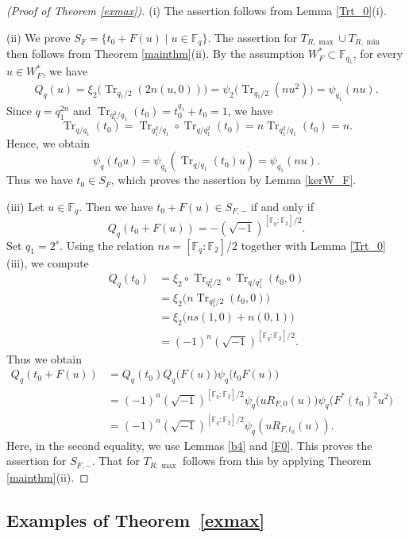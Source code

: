 \documentclass[12pt,a4paper]{amsart}
\theoremstyle{definition}
\def\F{{\mathbb F}}
\theoremstyle{remark}
\DeclareMathOperator{\Tr}{Tr}
\begin{document}
\begin{proof}[(Proof of Theorem \ref{exmax})]
(i) The assertion follows from Lemma \ref{Trt_0}(i). 


(ii) We  prove $S_F=\{t_0+F(u)\mid u\in\F_q\}$. The assertion for $T_{R,\max} \cup T_{R,\min}$ then follows from Theorem \ref{mainthm}(ii). By the assumption $W_F^\ast\subset \F_{q_1}$, for every $u\in W_F^\ast$, we have 
\begin{align*}
Q_q(u)=\xi_2\bigl(\Tr_{q_1/2}(2n(u,0))\bigr)=\psi_2\bigl(\Tr_{q_1/2}(nu^2)\bigr)=\psi_{q_1}(nu). 
\end{align*}
Since $q=q_1^{2n}$ and $\Tr_{q_1^2/q_1}(t_0)=t_0^{q_1}+t_0=1$, 
we have 
\[
\Tr_{q/q_1}(t_0)=\Tr_{q_1^2/q_1} \circ \Tr_{q/q_1^2}(t_0)=
n\Tr_{q_1^2/q_1}(t_0)=n.
\]
Hence, we obtain  
\[\psi_q(t_0u)=\psi_{q_1}(\Tr_{q/q_1}(t_0)u)=\psi_{q_1}(nu).\]
 Thus we have $t_0\in S_F$, which proves the assertion by Lemma \ref{kerW_F}. 

(iii) 
Let $u\in \F_q$. Then we have $t_0+F(u)\in S_{F,-}$ if and only if 
\[Q_q(t_0+F(u))=-(\sqrt{-1})^{[\F_q:\F_2]/2}. \]
Set $q_1 = 2^s$. Using the relation $ns = [\F_q:\F_2]/2$ together with Lemma \ref{Trt_0}(iii), we compute
\begin{align*}
Q_q(t_0) &= \xi_2 \circ \Tr_{q_1^2/2} \circ \Tr_{q/q_1^2}(t_0,0) \\
         &= \xi_2\bigl(n \Tr_{q_1^2/2}(t_0,0)\bigr) \\
         &= \xi_2\bigl(ns(1,0) + n(0,1)\bigr) \\
         &= (-1)^n (\sqrt{-1})^{[\F_q:\F_2]/2}.
\end{align*}
Thus we obtain 
\begin{align*}
Q_q(t_0+F(u))&=Q_q(t_0)Q_q\bigl(F(u)\bigr)\psi_q\bigl(t_0F(u)\bigr)\\
&=(-1)^n(\sqrt{-1})^{[\F_q:\F_2]/2}\psi_q\bigl(uR_{F,0}(u)\bigr)\psi_q\bigl(F^\ast(t_0)^2u^2\bigr)&\\&=(-1)^n(\sqrt{-1})^{[\F_q:\F_2]/2}\psi_q(uR_{F,t_0}(u)). 
\end{align*}
Here, in the second equality, we use Lemmas \ref{b4} and \ref{F0}.  This proves the assertion for $S_{F,-}$. That for $T_{R,\max}$ follows from this by applying Theorem \ref{mainthm}(ii). 
\end{proof}

\subsection{Examples of Theorem~\ref{exmax}}\label{EMT}
\end{document}
